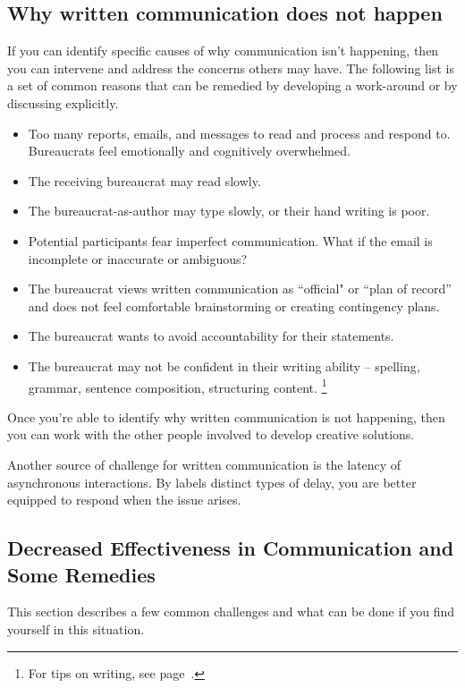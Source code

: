 \subsection*{Why written communication does not happen\label{sec:written-comm-does-not-happen}}
If you can identify specific causes of why communication isn't happening, then you can intervene and address the concerns others may have. The following list is a set of common reasons that can be remedied by developing a work-around or by discussing explicitly. 
\begin{itemize}
    \item Too many reports, emails, and messages to read and process and respond to. Bureaucrats feel emotionally and cognitively overwhelmed.
\item The receiving bureaucrat may read slowly.
\item The bureaucrat-as-author may type slowly, or their hand writing is poor.
\item Potential participants fear imperfect communication. What if the email is incomplete or inaccurate or ambiguous?
\item The bureaucrat views written communication as ``official" or ``plan of record'' and does not feel comfortable brainstorming or creating contingency plans.
\item The bureaucrat wants to avoid accountability for their statements.
\item The bureaucrat may not be confident in their writing ability -- spelling, grammar, sentence composition, structuring content. \footnote{For tips on writing, see page~\pageref{sec:resources-for-writing}.}
\end{itemize}
Once you're able to identify why written communication is not happening, then you can work with the other people involved to develop creative solutions. 

Another source of challenge for written communication is the latency of asynchronous interactions. By labels distinct types of delay, you are better equipped to respond when the issue arises. 



\subsection*{Decreased Effectiveness in Communication and Some Remedies}

This section describes a few common challenges and what can be done if you find yourself in this situation.

